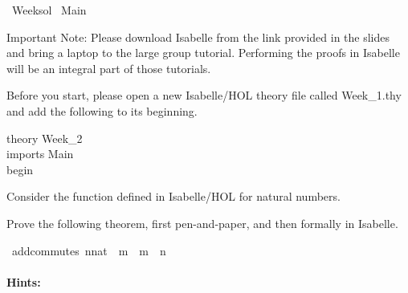%
\begin{isabellebody}%
%
%
\isadelimtheory
\isanewline
%
\endisadelimtheory
%
\isatagtheory
{}\isamarkupfalse%
\ Week{\isacharunderscore}{\kern0pt}{}{\isacharunderscore}{\kern0pt}sol\isanewline
{}\ Main\isanewline
{}%
\endisatagtheory
{\isafoldtheory}%
%
\isadelimtheory
%
\endisadelimtheory
%
\begin{isamarkuptext}%
\vspace{15ex}%
\end{isamarkuptext}\isamarkuptrue%
%
\begin{isamarkuptext}%
Important Note: Please download Isabelle from the link provided in the slides and bring a 
      laptop to the large group tutorial. Performing the proofs in Isabelle will be an integral part
      of those tutorials.%
\end{isamarkuptext}\isamarkuptrue%
%
\begin{isamarkuptext}%
Before you start, please open a new Isabelle/HOL theory file called Week\_1.thy and add the
       following to its beginning.

\noindent theory Week\_2\\
imports Main\\
begin%
\end{isamarkuptext}\isamarkuptrue%
%
\begin{isamarkuptext}%
%
\end{isamarkuptext}\isamarkuptrue%
%
\begin{isamarkuptext}%
Consider the function \isa{{\isacharparenleft}{\kern0pt}{\isacharplus}{\kern0pt}{\isacharparenright}{\kern0pt}} defined in Isabelle/HOL for natural numbers.

Prove the following theorem, first pen-and-paper, and then formally in Isabelle.%
\end{isamarkuptext}\isamarkuptrue%
\isamarkupfalse%
\ add{\isacharunderscore}{\kern0pt}commutes{\isacharcolon}{\kern0pt}\ {\isachardoublequoteopen}{\isacharparenleft}{\kern0pt}n{\isacharcolon}{\kern0pt}{\isacharcolon}{\kern0pt}nat{\isacharparenright}{\kern0pt}\ {\isacharplus}{\kern0pt}\ m\ {\isacharequal}{\kern0pt}\ m\ {\isacharplus}{\kern0pt}\ n{\isachardoublequoteclose}%
\begin{isamarkuptext}%
\paragraph{Hints:} 


\end{isamarkuptext}
\end{isabellebody}
